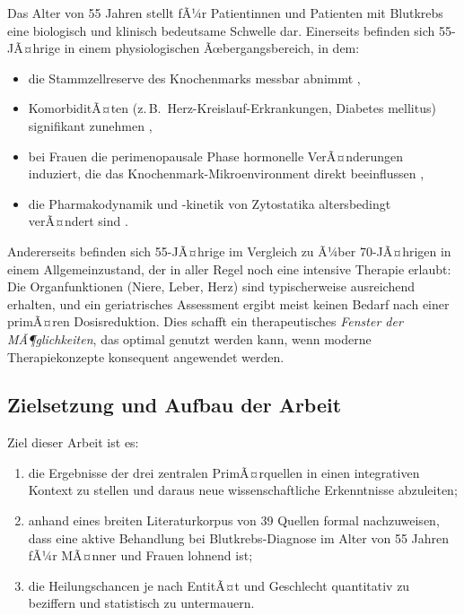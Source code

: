 ﻿\documentclass[12pt,a4paper]{article}
\theoremstyle{definition}
\begin{document}
Das Alter von 55 Jahren stellt fÃ¼r Patientinnen und Patienten mit Blutkrebs eine
biologisch und klinisch bedeutsame Schwelle dar. Einerseits befinden sich 55-JÃ¤hrige
in einem physiologischen Ãœbergangsbereich, in dem:
\begin{itemize}
  \item die Stammzellreserve des Knochenmarks messbar abnimmt \cite{appelbaum2006},
  \item KomorbiditÃ¤ten (z.\,B.\ Herz-Kreislauf-Erkrankungen, Diabetes mellitus)
        signifikant zunehmen \cite{extermann2007},
  \item bei Frauen die perimenopausale Phase hormonelle VerÃ¤nderungen induziert,
        die das Knochenmark-Mikroenvironment direkt beeinflussen
        \cite{cook2009,micheli2009},
  \item die Pharmakodynamik und -kinetik von Zytostatika altersbedingt verÃ¤ndert
        sind \cite{frey2010}.
\end{itemize}

Andererseits befinden sich 55-JÃ¤hrige im Vergleich zu Ã¼ber 70-JÃ¤hrigen in einem
Allgemeinzustand, der in aller Regel noch eine intensive Therapie erlaubt: Die
Organfunktionen (Niere, Leber, Herz) sind typischerweise ausreichend erhalten, und
ein geriatrisches Assessment \cite{wildiers2014} ergibt meist keinen Bedarf nach
einer primÃ¤ren Dosisreduktion. Dies schafft ein therapeutisches \emph{Fenster der
MÃ¶glichkeiten}, das optimal genutzt werden kann, wenn moderne Therapiekonzepte
konsequent angewendet werden.

\subsection{Zielsetzung und Aufbau der Arbeit}

Ziel dieser Arbeit ist es:
\begin{enumerate}
  \item die Ergebnisse der drei zentralen PrimÃ¤rquellen
        \cite{adeyemi2025,wong2016,mccabe2015} in einen integrativen Kontext zu
        stellen und daraus neue wissenschaftliche Erkenntnisse abzuleiten;
  \item anhand eines breiten Literaturkorpus von 39 Quellen formal nachzuweisen,
        dass eine aktive Behandlung bei Blutkrebs-Diagnose im Alter von 55 Jahren
        fÃ¼r MÃ¤nner und Frauen lohnend ist;
  \item die Heilungschancen je nach EntitÃ¤t und Geschlecht quantitativ zu
        beziffern und statistisch zu untermauern.
\end{enumerate}
\end{document}
